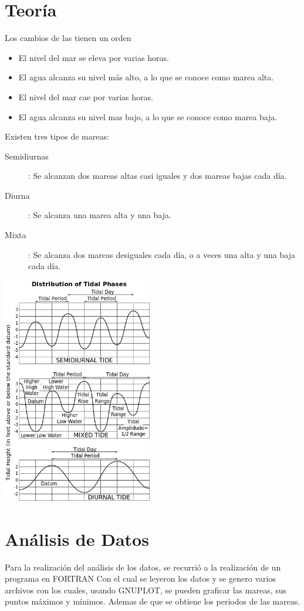 \documentclass[12pt]{article}
\begin{document}
\pagebreak
\section{Teoría}
Los cambios de las tienen un orden
\begin{itemize}
\item El nivel del mar se eleva por varias horas.
\item El agua alcanza su nivel más alto, a lo que se conoce como marea alta.
\item El nivel del mar cae por varias horas.
\item El agua alcanza su nivel mas bajo, a lo que se conoce como marea baja.
\end{itemize}

Existen tres tipos de mareas:
\begin{description}
\item[Semidiurnas]: Se alcanzan dos mareas altas casi iguales y dos mareas bajas cada día.
\item[Diurna]: Se alcanza una marea alta y una baja.
\item[Mixta]: Se alcanza dos mareas desiguales cada día, o a veces una alta y una baja cada día. 
\end{description}
\begin{center}
\includegraphics[height=10cm]{Tide_type.png}
\end{center}

\pagebreak

\section{Análisis de Datos}
Para la realización del análisis de los datos, se recurrió a la realización de un programa en FORTRAN Con el cual se leyeron los datos y se genero varios archivos con los cuales, usando GNUPLOT, se pueden graficar las mareas, sus puntos máximos y mínimos. Ademas de que se obtiene los periodos de las mareas.
\end{document}
